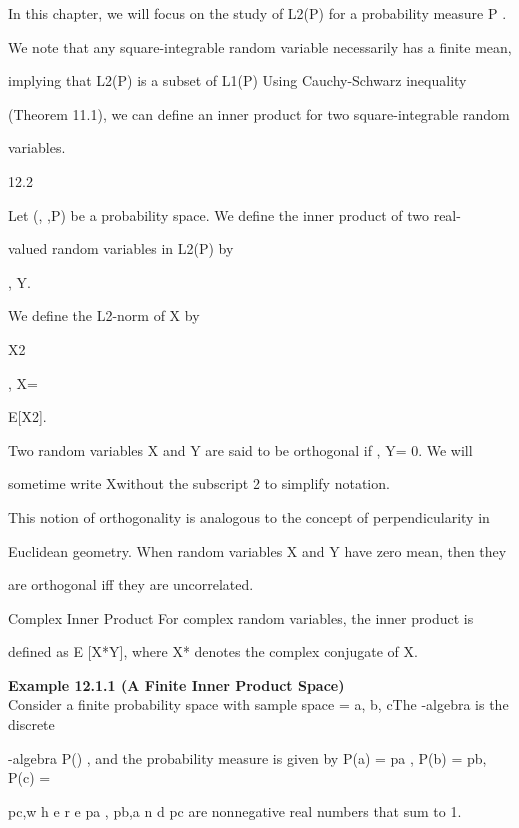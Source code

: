 In this chapter, we will focus on the study of L2(P) for a probability measure P .

We note that any square-integrable random variable necessarily has a finite mean,

implying that L2(P) is a subset of L1(P) Using Cauchy-Schwarz inequality

(Theorem 11.1), we can define an inner product for two square-integrable random

variables.

\begin{defbox}{12.2}
\end{defbox}

Let (\Omega, ,P) be a probability space. We define the inner product of two real-

valued random variables in L2(P) by

\langleX, Y\rangle\coloneqqE[XY ].

We define the L2-norm of X by

X2 \coloneqq

\sqrt

\langleX, X\rangle=

\sqrt

E[X2].

Two random variables X and Y are said to be orthogonal if \langleX, Y\rangle= 0. We will

sometime write Xwithout the subscript 2 to simplify notation.

This notion of orthogonality is analogous to the concept of perpendicularity in

Euclidean geometry. When random variables X and Y have zero mean, then they

are orthogonal iff they are uncorrelated.

Complex Inner Product For complex random variables, the inner product is

defined as E [X*Y], where X* denotes the complex conjugate of X.

\textbf{Example 12.1.1 (A Finite Inner Product Space)} \\

Consider a finite probability space with sample space \Omega ={ a, b, c}The \sigma-algebra is the discrete

\sigma-algebra P(\Omega) , and the probability measure is given by P({a}) = pa , P({b}) = pb, P({c}) =

pc,w h e r e pa , pb,a n d pc are nonnegative real numbers that sum to 1.

